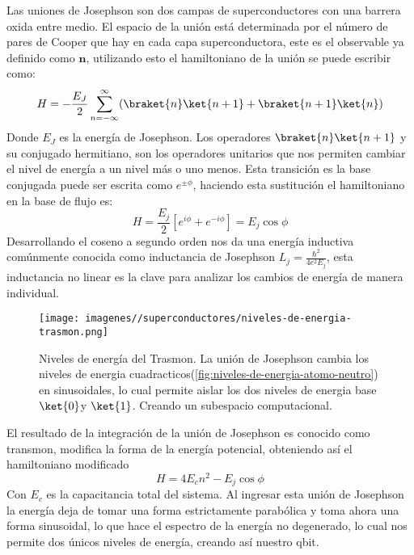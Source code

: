 Las uniones de Josephson son dos campas de superconductores con una barrera oxida entre medio. El espacio de la unión está determinada por el número de pares de Cooper que hay en cada capa superconductora, este es el observable ya definido como $\mathbf{n}$, utilizando esto el hamiltoniano de la unión se puede escribir como:
\begin{equation}
    H=-\frac{E_{J}}{2}\sum^{\infty}_{n=-\infty}(\braket{n}\ket{n+1}+\braket{n+1}\ket{n})
\end{equation}
Donde $E_{J}$ es la energía de Josephson. Los operadores $\braket{n}\ket{n+1}$ y su conjugado hermitiano, son los operadores unitarios que nos permiten cambiar el nivel de energía a un nivel más o uno menos. Esta transición es la base conjugada puede ser escrita como $e^{\pm\phi}$, haciendo esta sustitución el hamiltoniano en la  base de flujo es:
\begin{equation}
    H=\frac{E_{j}}{2}[e^{i\phi}+e^{-i\phi}]=E_{j}\cos\phi
\end{equation}
Desarrollando el coseno a segundo orden nos da una energía inductiva comúnmente conocida como inductancia de Josephson $L_{j}=\frac{\hbar^{2}}{4e^{2}E_{j}}$, esta inductancia no linear es la clave para analizar los cambios de energía de manera individual.

\begin{figure}
    \centering
    \texttt{[image: imagenes//superconductores/niveles-de-energia-trasmon.png]}
    \caption{Niveles de energía del Trasmon. La unión de Josephson cambia los niveles de energia cuadracticos(\ref{fig:niveles-de-energia-atomo-neutro}) en sinusoidales, lo cual permite aislar los dos niveles de energia base $\ket{0}$y $\ket{1}$. Creando un subespacio computacional.}
    \label{fig:niveles-de-energia-trasmon}
\end{figure}

El resultado de la integración de la unión de Josephson es conocido como transmon, modifica la forma de la energía potencial, obteniendo así el hamiltoniano modificado
\begin{equation}
    H=4E_{c}n^{2}-E_{j}\cos\phi
\end{equation}
Con $E_{c}$ es la capacitancia total del sistema. Al ingresar esta unión de Josephson la energía deja de tomar una forma estrictamente parabólica y toma ahora una forma sinusoidal, lo que hace el espectro de la energía no degenerado, lo cual nos permite dos únicos niveles de energía, creando así nuestro qbit.

